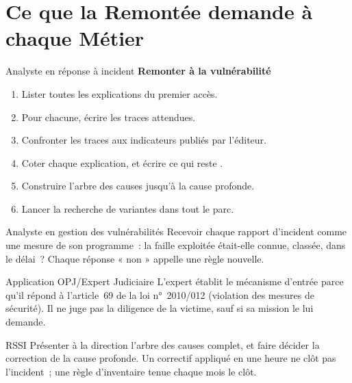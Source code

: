 \section{Ce que la Remontée demande à chaque Métier}
\label{sec:c12-metiers}

\begin{boxmetier}{Analyste en réponse à incident}
\textbf{Remonter à la vulnérabilité}
\begin{enumerate}
    \item Lister toutes les explications du premier accès.
    \item Pour chacune, écrire les traces attendues.
    \item Confronter les traces aux indicateurs publiés par l'éditeur.
    \item Coter chaque explication, et écrire ce qui reste \NEK{}.
    \item Construire l'arbre des causes jusqu'à la cause profonde.
    \item Lancer la recherche de variantes dans tout le parc.
\end{enumerate}
\end{boxmetier}

\begin{boxmetier}{Analyste en gestion des vulnérabilités}
Recevoir chaque rapport d'incident comme une mesure de son programme~: la
faille exploitée était-elle connue, classée, dans le délai~? Chaque réponse
« non » appelle une règle nouvelle.
\end{boxmetier}

\begin{boxmetier}{Application OPJ/Expert Judiciaire}
L'expert établit le mécanisme d'entrée parce qu'il répond à l'article~69
de la loi n°~2010/012 (violation des mesures de sécurité). Il ne juge pas
la diligence de la victime, sauf si sa mission le lui demande.
\end{boxmetier}

\begin{boxmetier}{RSSI}
Présenter à la direction l'arbre des causes complet, et faire décider la
correction de la cause profonde. Un correctif appliqué en une heure ne
clôt pas l'incident~; une règle d'inventaire tenue chaque mois le clôt.
\end{boxmetier}

\separateur

